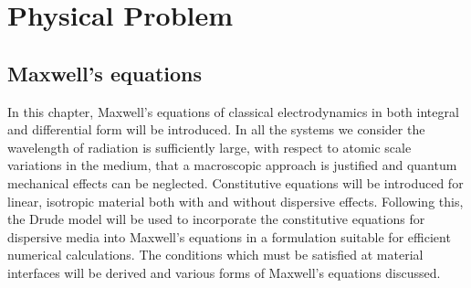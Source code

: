 %
\chapter{Physical Problem} %
\label{PhysicalProblemChapter}

\section{Maxwell's equations}

%

In this chapter, Maxwell's equations of classical electrodynamics in both integral and differential form will be introduced. In all the systems we consider the wavelength of radiation is sufficiently large, with respect to atomic scale variations in the medium, that a macroscopic approach is justified and quantum mechanical effects can be neglected. Constitutive equations will be introduced for linear, isotropic material both with and without dispersive effects. Following this, the Drude model will be used to incorporate the constitutive equations for dispersive media into Maxwell's equations in a formulation suitable for efficient numerical calculations. The conditions which must be satisfied at material interfaces will be derived and various forms of Maxwell's equations discussed.

